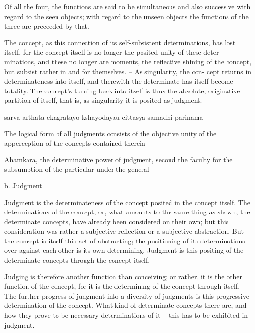Of all the four, the functions are said to be simultaneous and also successive
with regard to the seen objects;
with regard to the unseen objects
the functions of the three are preceeded by that.

The concept, as this connection of its self-subsistent determinations, has
lost itself, for the concept itself is no longer the posited unity of these deter-
minations, and these no longer are moments, the reflective shining of the
concept, but subsist rather in and for themselves. – As singularity, the con-
cept returns in determinateness into itself, and therewith the determinate
has itself become totality. The concept’s turning back into itself is thus the
absolute, originative partition of itself, that is, as singularity it is posited as
judgment.

sarva-arthata-ekagratayo kshayodayau cittasya samadhi-parinama

The logical form of all judgments consists of the objective unity of
the apperception of the concepts contained therein

Ahamkara, the determinative power of judgment,
second the faculty for the subsumption of the particular under the general

b. Judgment

Judgment is the determinateness of the concept posited in the concept itself.
The determinations of the concept, or, what amounts to the same thing
as shown, the determinate concepts, have already been considered on
their own; but this consideration was rather a subjective reflection or a
subjective abstraction. But the concept is itself this act of abstracting;
the positioning of its determinations over against each other is its own
determining. Judgment is this positing of the determinate concepts through
the concept itself.

Judging is therefore another function than conceiving; or rather, it is the
other function of the concept, for it is the determining of the concept through
itself. The further progress of judgment into a diversity of judgments is
this progressive determination of the concept. What kind of determinate
concepts there are, and how they prove to be necessary determinations of
it – this has to be exhibited in judgment.

